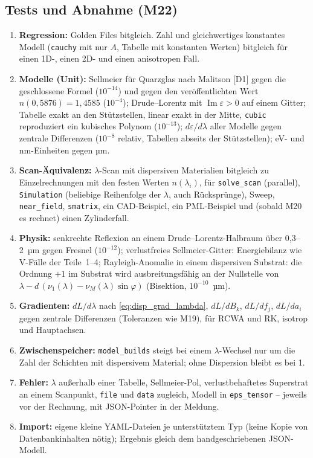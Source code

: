 \subsection{Tests und Abnahme (M22)}
\begin{enumerate}[label=V23\alph*,nosep,leftmargin=3.2em]
  \item \textbf{Regression:} Golden Files bitgleich. Zahl und gleichwertiges konstantes Modell
        (\verb|cauchy| mit nur $A$, Tabelle mit konstanten Werten) bitgleich für einen 1D-, einen 2D- und einen
        anisotropen Fall.
  \item \textbf{Modelle (Unit):} Sellmeier für Quarzglas nach Malitson [D1] gegen die geschlossene Formel
        ($10^{-14}$) und gegen den veröffentlichten Wert $n(0{,}5876)=1{,}4585$ ($10^{-4}$); Drude--Lorentz mit
        $\operatorname{Im}\varepsilon>0$ auf einem Gitter; Tabelle exakt an den Stützstellen, linear exakt in der
        Mitte, \verb|cubic| reproduziert ein kubisches Polynom ($10^{-13}$); $d\varepsilon/d\lambda$ aller Modelle
        gegen zentrale Differenzen ($10^{-8}$ relativ, Tabellen abseits der Stützstellen); eV- und nm-Einheiten
        gegen µm.
  \item \textbf{Scan-Äquivalenz:} $\lambda$-Scan mit dispersiven Materialien bitgleich zu Einzelrechnungen mit den
        festen Werten $n(\lambda_i)$, für \verb|solve_scan| (parallel), \verb|Simulation| (beliebige Reihenfolge
        der $\lambda$, auch Rücksprünge), Sweep, \verb|near_field|, \verb|smatrix|, ein CAD-Beispiel, ein
        PML-Beispiel und (sobald M20 es rechnet) einen Zylinderfall.
  \item \textbf{Physik:} senkrechte Reflexion an einem Drude--Lorentz-Halbraum über 0,3--2~µm gegen Fresnel
        ($10^{-12}$); verlustfreies Sellmeier-Gitter: Energiebilanz wie V-Fälle der Teile~1--4; Rayleigh-Anomalie
        in einem dispersiven Substrat: die Ordnung $+1$ im Substrat wird ausbreitungsfähig an der Nullstelle von
        $\lambda-d\,(\nu_1(\lambda)-\nu_M(\lambda)\sin\varphi)$ (Bisektion, $10^{-10}$~µm).
  \item \textbf{Gradienten:} $dL/d\lambda$ nach \eqref{eq:disp_grad_lambda}, $dL/dB_k$, $dL/df_j$, $dL/da_i$ gegen
        zentrale Differenzen (Toleranzen wie M19), für RCWA und RK, isotrop und Hauptachsen.
  \item \textbf{Zwischenspeicher:} \verb|model_builds| steigt bei einem $\lambda$-Wechsel nur um die Zahl der
        Schichten mit dispersivem Material; ohne Dispersion bleibt es bei 1.
  \item \textbf{Fehler:} $\lambda$ außerhalb einer Tabelle, Sellmeier-Pol, verlustbehaftetes Superstrat an einem
        Scanpunkt, \verb|file| und \verb|data| zugleich, Modell in \verb|eps_tensor| -- jeweils vor der Rechnung, mit
        JSON-Pointer in der Meldung.
  \item \textbf{Import:} eigene kleine YAML-Dateien je unterstütztem Typ (keine Kopie von Datenbankinhalten nötig);
        Ergebnis gleich dem handgeschriebenen JSON-Modell.
\end{enumerate}
